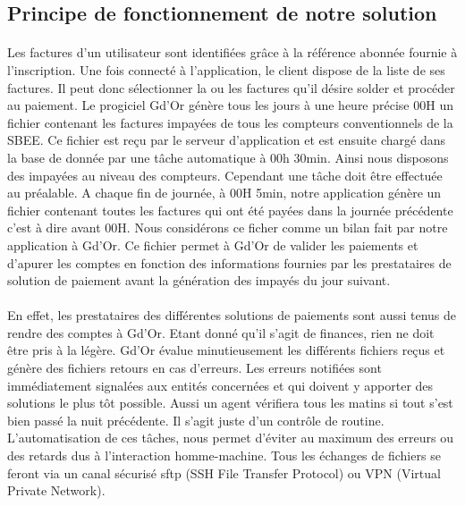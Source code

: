   \subsection{Principe de fonctionnement de notre solution}
	  \paragraph{}
	  	Les factures d'un utilisateur sont identifi\'ees gr\^ace \`a la r\'ef\'erence abonn\'ee fournie \`a l'inscription. Une fois connect\'e \`a l'application, le client dispose de la liste de ses factures. Il peut donc s\'electionner la ou les factures qu'il d\'esire solder et proc\'eder au paiement. Le progiciel Gd'Or g\'en\`ere tous les jours \`a une heure pr\'ecise 00H un fichier contenant les factures impay\'ees de tous les compteurs conventionnels de la SBEE. Ce fichier est reçu par le serveur d'application et est ensuite charg\'e dans la  base de donn\'ee par une t\^ache automatique \`a 00h 30min. Ainsi nous disposons des impay\'ees au niveau des compteurs. Cependant une t\^ache doit \^etre effectu\'ee au pr\'ealable. A chaque fin de journ\'ee, \`a 00H 5min, notre application g\'en\`ere un fichier contenant toutes les factures qui ont \'et\'e pay\'ees dans la journ\'ee pr\'ec\'edente c'est \`a dire avant 00H. Nous consid\'erons ce ficher comme un bilan fait par notre application \`a Gd'Or. Ce fichier permet \`a Gd'Or de valider les paiements et d'apurer les comptes en fonction des informations fournies par les prestataires de solution de paiement avant la génération des impayés du jour suivant.
	  \paragraph{}
	  	En effet, les prestataires des diff\'erentes solutions de paiements sont aussi tenus de rendre des comptes \`a Gd'Or. Etant donn\'e qu'il s'agit de finances, rien ne doit \^etre pris \`a la l\'eg\`ere. Gd'Or \'evalue minutieusement les diff\'erents fichiers re\c{c}us et g\'en\`ere des fichiers retours en cas d'erreurs.  Les erreurs notifi\'ees sont imm\'ediatement signal\'ees aux entit\'es concern\'ees et qui doivent y apporter des solutions le plus t\^ot possible. Aussi un agent v\'erifiera tous les matins si tout s'est bien pass\'e la nuit pr\'ec\'edente. Il s'agit juste d'un contr\^ole de routine. L'automatisation de ces t\^aches, nous permet d'\'eviter au maximum des erreurs ou des retards dus \`a l'interaction homme-machine. Tous les \'echanges de fichiers se feront via un canal s\'ecuris\'e \gls{sftp} (SSH File Transfer Protocol) ou VPN (Virtual Private Network).
